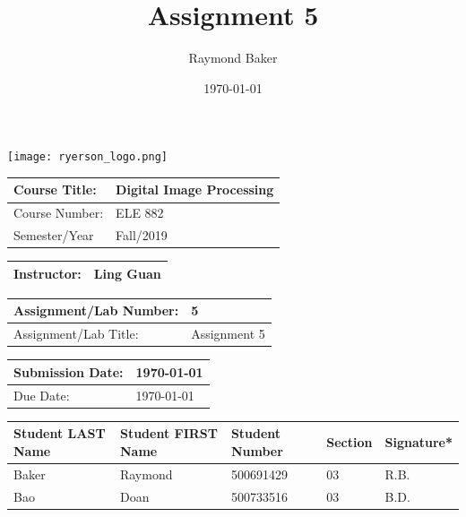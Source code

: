 \documentclass[
]{article}
\date{}
\begin{document}
\title{Assignment 5}
\author{Raymond Baker}
\date{\today}

\texttt{[image: ryerson\_logo.png]}

\begin{flushleft}
\begin{tabular}{|p{}|p{}|} 
 \hline
    Course Title: & Digital Image Processing \\ [5ex]
 \hline
    Course Number: & ELE 882 \\ [5ex]
 \hline
    Semester/Year & Fall/2019 \\ [5ex]
 \hline

\end{tabular}
\end{flushleft}

\begin{flushleft}
\begin{tabular}{|p{}|p{}|} 
 \hline
    Instructor: & Ling Guan \\ [5ex]
 \hline
\end{tabular}
\end{flushleft}

\begin{flushleft}
\begin{tabular}{|p{}|p{}|} 
 \hline
    Assignment/Lab Number: & 5 \\[5ex]
 \hline
    Assignment/Lab Title: & Assignment 5 \\[5ex]
 \hline
\end{tabular}
\end{flushleft}

\begin{flushleft}
\begin{tabular}{|p{}|p{}|} 
 \hline
    Submission Date: & \today \\[5ex]
 \hline
    Due Date: & \today \\[5ex]
 \hline
\end{tabular}
\end{flushleft}

\begin{flushleft}
\begin{tabular}{|p{}|p{}|p{}|p{}|p{}|}
 \hline
     Student \linebreak LAST Name & Student \linebreak FIRST Name & Student \linebreak Number & Section & Signature* \\
 \hline
    Baker & Raymond & 500691429 & 03 & R.B. \\[5ex]
 \hline
    Bao & Doan & 500733516 & 03 & B.D. \\[5ex]
 \hline
\end{tabular}
\end{flushleft}
\end{document}
